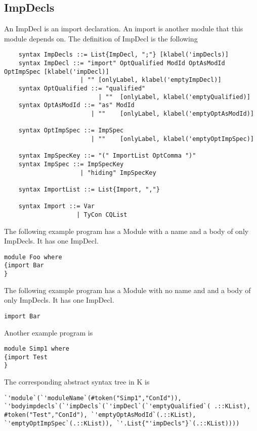\subsection{ImpDecls}
An ImpDecl is an import declaration. An import is another module that this module depends on.
The definition of ImpDecl is the following
\begin{lstlisting}
    syntax ImpDecls ::= List{ImpDecl, ";"} [klabel('impDecls)]
    syntax ImpDecl ::= "import" OptQualified ModId OptAsModId OptImpSpec [klabel('impDecl)]
                     | "" [onlyLabel, klabel('emptyImpDecl)]
    syntax OptQualified ::= "qualified"
                          | ""  [onlyLabel, klabel('emptyQualified)]
    syntax OptAsModId ::= "as" ModId
                        | ""    [onlyLabel, klabel('emptyOptAsModId)]

    syntax OptImpSpec ::= ImpSpec
                        | ""    [onlyLabel, klabel('emptyOptImpSpec)]

    syntax ImpSpecKey ::= "(" ImportList OptComma ")"
    syntax ImpSpec ::= ImpSpecKey
                     | "hiding" ImpSpecKey

    syntax ImportList ::= List{Import, ","}

    syntax Import ::= Var
                    | TyCon CQList
\end{lstlisting}

The following example program has a Module with a name and a body of only ImpDecls. It has one ImpDecl.

\begin{lstlisting}
module Foo where
{import Bar
}
\end{lstlisting}

The following example program has a Module with no name and and a body of only ImpDecls. It has one ImpDecl.

\begin{lstlisting}
import Bar
\end{lstlisting}

Another example program is
\begin{lstlisting}
module Simp1 where
{import Test
}
\end{lstlisting}

The corresponding abstract syntax tree in K is
\begin{lstlisting}
`'module`(`'moduleName`(#token("Simp1","ConId")), `'bodyimpdecls`(`'impDecls`(`'impDecl`(`'emptyQualified`( .::KList), #token("Test","ConId"), `'emptyOptAsModId`(.::KList), `'emptyOptImpSpec`(.::KList)), `'.List{"'impDecls"}`(.::KList))))
\end{lstlisting}

